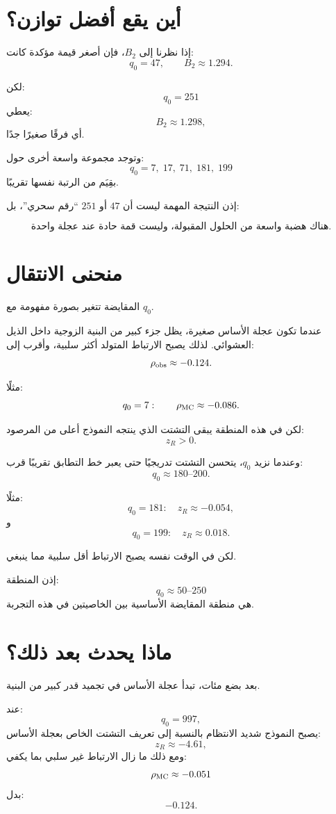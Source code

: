 \documentclass[12pt]{article}
\begin{document}
\section{أين يقع أفضل توازن؟}

إذا نظرنا إلى \(B_2\)، فإن أصغر قيمة مؤكدة كانت:
\[
\boxed{q_0=47,\qquad B_2\approx1.294.}
\]

لكن:
\[
q_0=251
\]
يعطي:
\[
B_2\approx1.298,
\]
أي فرقًا صغيرًا جدًا.

وتوجد مجموعة واسعة أخرى حول:
\[
q_0=7,\;17,\;71,\;181,\;199
\]
بقِيَم من الرتبة نفسها تقريبًا.

إذن النتيجة المهمة ليست أن \(47\) أو \(251\) ``رقم سحري''، بل:

\[
\boxed{\text{هناك هضبة واسعة من الحلول المقبولة، وليست قمة حادة عند عجلة واحدة.}}
\]

\section{منحنى الانتقال}

المقايضة تتغير بصورة مفهومة مع \(q_0\).

عندما تكون عجلة الأساس صغيرة، يظل جزء كبير من البنية الزوجية داخل الذيل العشوائي.
لذلك يصبح الارتباط المتولد أكثر سلبية، وأقرب إلى:
\[
\rho_{\rm obs}\approx-0.124.
\]

مثلًا:
\[
q_0=7:\qquad \rho_{\rm MC}\approx-0.086.
\]

لكن في هذه المنطقة يبقى التشتت الذي ينتجه النموذج أعلى من المرصود:
\[
z_R>0.
\]

وعندما نزيد \(q_0\)، يتحسن التشتت تدريجيًا حتى يعبر خط التطابق تقريبًا قرب:
\[
q_0\approx180\text{--}200.
\]

مثلًا:
\[
q_0=181:\quad z_R\approx-0.054,
\]
و
\[
q_0=199:\quad z_R\approx0.018.
\]

لكن في الوقت نفسه يصبح الارتباط أقل سلبية مما ينبغي.

إذن المنطقة:
\[
\boxed{q_0\approx 50\text{--}250}
\]
هي منطقة المقايضة الأساسية بين الخاصيتين في هذه التجربة.

\section{ماذا يحدث بعد ذلك؟}

بعد بضع مئات، تبدأ عجلة الأساس في تجميد قدر كبير من البنية.

عند:
\[
q_0=997,
\]
يصبح النموذج شديد الانتظام بالنسبة إلى تعريف التشتت الخاص بعجلة الأساس:
\[
z_R\approx-4.61,
\]
ومع ذلك ما زال الارتباط غير سلبي بما يكفي:
\[
\rho_{\rm MC}\approx-0.051
\]
بدل:
\[
-0.124.
\]
\end{document}
